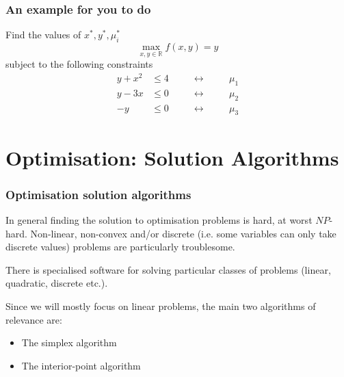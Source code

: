 \documentclass[10pt,aspectratio=169,dvipsnames]{beamer}
\def\m{\mu}
\let\olditem\item
\renewcommand{\item}{%
\olditem\vspace{5pt}}
\begin{document}
\begin{frame}
  \frametitle{An example for you to do}

  Find the values of $x^*,y^*,\m_i^*$
  \begin{equation*}
    \max_{x,y\in \mathbb{R}} f(x,y) = y
  \end{equation*}
  subject to the following constraints
  \begin{align*}
    y + x^2 & \leq 4  \hspace{1cm}\leftrightarrow\hspace{1cm} \m_1 \\
    y - 3x & \leq 0  \hspace{1cm}\leftrightarrow\hspace{1cm} \m_2\\
    -y & \leq 0  \hspace{1cm}\leftrightarrow\hspace{1cm} \m_3
  \end{align*}
\end{frame}


\section{Optimisation: Solution Algorithms}


\begin{frame}
  \frametitle{Optimisation solution algorithms}

  In general finding the solution to optimisation problems is hard,
  at worst $NP$-hard. Non-linear,
  non-convex and/or discrete (i.e. some variables can only take
  discrete values) problems are particularly troublesome.

  There is specialised software for solving particular classes of
  problems (linear, quadratic, discrete etc.).

  Since we will mostly focus on linear problems, the main two
  algorithms of relevance are:
  \begin{itemize}
  \item The \alert{simplex algorithm}
  \item The \alert{interior-point algorithm}
  \end{itemize}

\end{frame}
\end{document}
